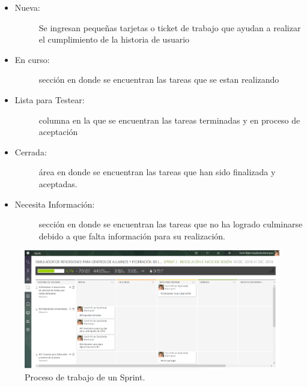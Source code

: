 \begin{itemize}
    \item   \begin{description}
                \item[Nueva:] Se ingresan pequeñas tarjetas o ticket de trabajo que ayudan a realizar el cumplimiento de la historia de usuario 
            \end{description}

    \item   \begin{description}
                \item[En curso:] sección en donde se encuentran las tareas que se estan realizando
            \end{description}

    \item   \begin{description}
                \item[Lista para Testear:] columna en la que se encuentran las tareas terminadas y en proceso de aceptación
            \end{description}

    \item   \begin{description}
                \item[Cerrada:] área en donde se encuentran las tareas que han sido finalizada y aceptadas.
            \end{description}
    
    \item   \begin{description}
                \item[Necesita Información:] sección en donde se encuentran las tareas que no ha logrado culminarse debido a que falta información para su realización.
            \end{description}
\end{itemize}

\begin{figure}[h!]
    \includegraphics[width=\textwidth]{Imagenes/Kanban.png}
    \caption{\label{fig: kanbanSprint} Proceso de trabajo de un Sprint.}
\end{figure}

